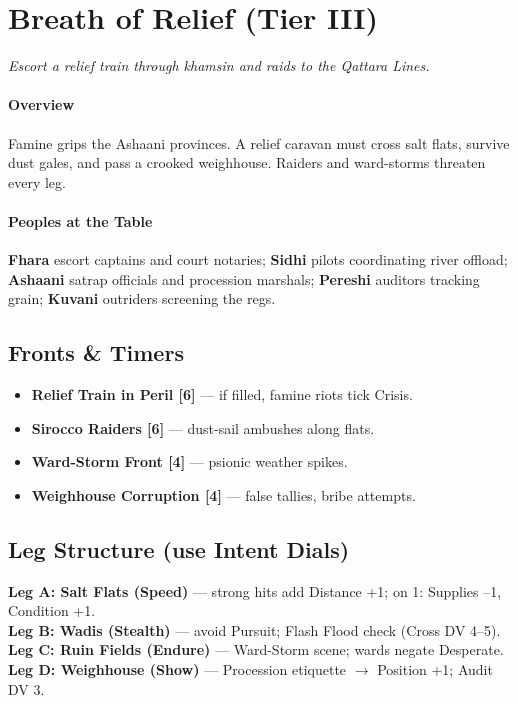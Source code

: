 \documentclass[11pt]{article}
\begin{document}
\section*{Breath of Relief (Tier III)}
\textit{Escort a relief train through khamsin and raids to the Qattara Lines.}

\paragraph{Overview} Famine grips the Ashaani provinces. A relief caravan must cross salt flats, survive dust gales, and pass a crooked weighhouse. Raiders and ward-storms threaten every leg.

\paragraph{Peoples at the Table}
\textbf{Fhara} escort captains and court notaries; \textbf{Sidhi} pilots coordinating river offload; \textbf{Ashaani} satrap officials and procession marshals; \textbf{Pereshi} auditors tracking grain; \textbf{Kuvani} outriders screening the regs.

\subsection*{Fronts \& Timers}
\begin{itemize}
  \item \textbf{Relief Train in Peril [6]} --- if filled, famine riots tick Crisis.
  \item \textbf{Sirocco Raiders [6]} --- dust-sail ambushes along flats.
  \item \textbf{Ward-Storm Front [4]} --- psionic weather spikes.
  \item \textbf{Weighhouse Corruption [4]} --- false tallies, bribe attempts.
\end{itemize}

\subsection*{Leg Structure (use Intent Dials)}
\textbf{Leg A: Salt Flats (Speed)} --- strong hits add Distance +1; on 1: Supplies --1, Condition +1. \\
\textbf{Leg B: Wadis (Stealth)} --- avoid Pursuit; Flash Flood check (Cross DV 4--5). \\
\textbf{Leg C: Ruin Fields (Endure)} --- Ward-Storm scene; wards negate Desperate. \\
\textbf{Leg D: Weighhouse (Show)} --- Procession etiquette $\rightarrow$ Position +1; Audit DV 3.
\end{document}
